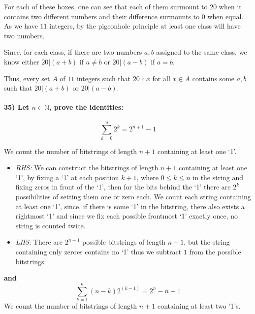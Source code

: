 \documentclass[
]{article}
\providecommand{\tightlist}{%
  \setlength{\itemsep}{0pt}\setlength{\parskip}{0pt}}
\begin{document}
For each of these boxes, one can see that each of them surmount to
\(20\) when it contains two different numbers and their difference
surmounts to \(0\) when equal. As we have \(11\) integers, by the
pigeonhole principle at least one class will have two numbers.

Since, for each class, if there are two numbers \(a,b\) assigned to the
same class, we know either \(20 | (a + b)\) if \(a \neq b\) or
\(20 | (a-b)\) if \(a = b\).

Thus, every set \(A\) of \(11\) integers such that \(20 \nmid x\) for
all \(x \in A\) contains some \(a,b\) such that \(20 | (a + b)\) or
\(20 | (a-b)\).

\hypertarget{let-n-in-mathbbn-prove-the-identities}{%
\paragraph{\texorpdfstring{35) Let \(n \in \mathbb{N}\), prove the
identities:}{35) Let n \textbackslash in \textbackslash mathbb\{N\}, prove the identities:}}\label{let-n-in-mathbbn-prove-the-identities}}

\[
    \sum_{k=0}^{n} 2^k = 2^{n+1}-1
\]

We count the number of bitstrings of length \(n+1\) containing at least
one `1'.

\begin{itemize}
\tightlist
\item
  \emph{RHS:} We can construct the bitstrings of length \(n+1\)
  containing at least one `1', by fixing a `1' at each position \(k+1\),
  where \(0 \leq k \leq n\) in the string and fixing zeros in front of
  the `1', then for the bits behind the `1' there are \(2^k\)
  possibilities of setting them one or zero each. We count each string
  containing at least one `1', since, if there is some `1' in the
  bitstring, there also exists a rightmost `1' and since we fix each
  possible frontmost `1' exactly once, no string is counted twice.
\item
  \emph{LHS:} There are \(2^{n+1}\) possible bitstrings of length
  \(n+1\), but the string containing only zeroes contains no `1' thus we
  subtract \(1\) from the possible bitstrings.
\end{itemize}

\textbf{and} \[
\sum_{k=1}^n (n-k)2^{(k-1)} = 2^n - n - 1
\] We count the number of bitstrings of length \(n+1\) containing at
least two '1's.
\end{document}
